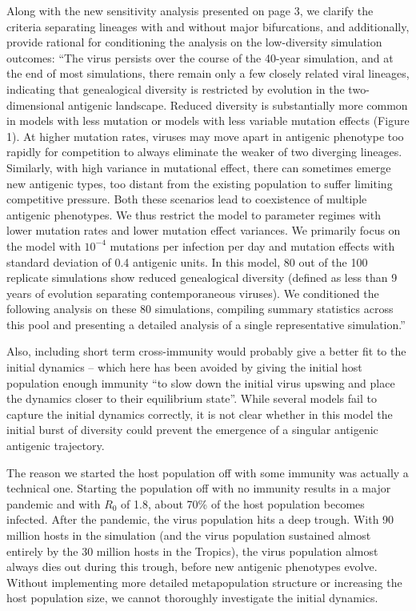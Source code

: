 \documentclass[11pt,oneside,letterpaper]{article}
\def\comment#1{
#1
}
\def\response#1{
\begin{bf}
#1
\end{bf}
}
\def\break{\vspace{0.2cm}}
\begin{document}
\response{Along with the new sensitivity analysis presented on page 3, we clarify the criteria separating lineages with and without major bifurcations, and additionally, provide rational for conditioning the analysis on the low-diversity simulation outcomes: ``The virus persists over the course of the 40-year simulation, and at the end of most simulations, there remain only a few closely related viral lineages, indicating that genealogical diversity is restricted by evolution in the two-dimensional antigenic landscape.  Reduced diversity is substantially more common in models with less mutation or models with less variable mutation effects (Figure 1).  At higher mutation rates, viruses may move apart in antigenic phenotype too rapidly for competition to always eliminate the weaker of two diverging lineages.  Similarly, with high variance in mutational effect, there can sometimes emerge new antigenic types, too distant from the existing population to suffer limiting competitive pressure.  Both these scenarios lead to coexistence of multiple antigenic phenotypes.  We thus restrict the model to parameter regimes with lower mutation rates and lower mutation effect variances.  We primarily focus on the model with $10^{-4}$ mutations per infection per day and mutation effects with standard deviation of 0.4 antigenic units.  In this model, 80 out of the 100 replicate simulations show reduced genealogical diversity (defined as less than 9 years of evolution separating contemporaneous viruses).  We conditioned the following analysis on these 80 simulations, compiling summary statistics across this pool and presenting a detailed analysis of a single representative simulation.''}

\break

\comment{Also, including short term cross-immunity would probably give a better fit to the initial dynamics – which here has been avoided by giving the initial host population enough immunity ``to slow down the initial virus upswing and place the dynamics closer to their equilibrium state''. While several models fail to capture the initial dynamics correctly, it is not clear whether in this model the initial burst of diversity could prevent the emergence of a singular antigenic antigenic trajectory.}

\response{The reason we started the host population off with some immunity was actually a technical one.  Starting the population off with no immunity results in a major pandemic and with $R_0$ of 1.8, about 70\% of the host population becomes infected.  After the pandemic, the virus population hits a deep trough.  With 90 million hosts in the simulation (and the virus population sustained almost entirely by the 30 million hosts in the Tropics), the virus population almost always dies out during this trough, before new antigenic phenotypes evolve.  Without implementing more detailed metapopulation structure or increasing the host population size, we cannot thoroughly investigate the initial dynamics.}
\end{document}

